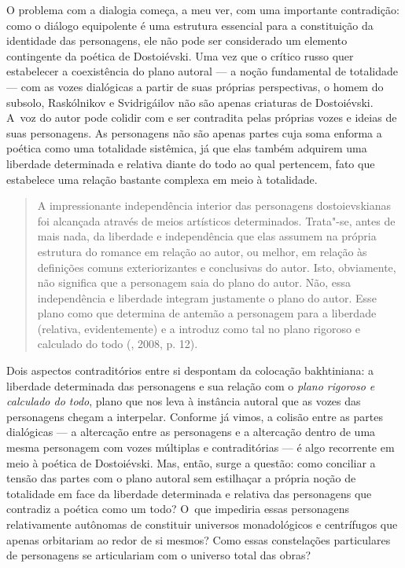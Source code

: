 O problema com a dialogia começa, a meu ver, com uma importante
contradição: como o diálogo equipolente é uma estrutura essencial para a
constituição da identidade das personagens, ele não pode ser considerado
um elemento contingente da poética de Dostoiévski. Uma vez que o crítico
russo quer estabelecer a coexistência do plano autoral --- a noção
fundamental de totalidade --- com as vozes dialógicas a partir de suas
próprias perspectivas, o homem do subsolo, Raskólnikov e Svidrigáilov
não são apenas criaturas de Dostoiévski. A~voz do autor pode colidir com
e ser contradita pelas próprias vozes e ideias de suas personagens. As
personagens não são apenas partes cuja soma enforma a poética como uma
totalidade sistêmica, já que elas também adquirem uma liberdade
determinada e relativa diante do todo ao qual pertencem, fato que
estabelece uma relação bastante complexa em meio à totalidade.

\begin{quote}
A impressionante independência interior das personagens dostoievskianas
foi alcançada através de meios artísticos determinados. Trata"-se, antes
de mais nada, da liberdade e independência que elas assumem na própria
estrutura do romance em relação ao autor, ou melhor, em relação às
definições comuns exteriorizantes e conclusivas do autor. Isto,
obviamente, não significa que a personagem saia do plano do autor. Não,
essa independência e liberdade integram justamente o plano do autor.
Esse plano como que determina de antemão a personagem para a liberdade
(relativa, evidentemente) e a introduz como tal no plano rigoroso e
calculado do todo (, 2008, p. 12).
\end{quote}

Dois aspectos contraditórios entre si despontam da colocação
bakhtiniana: a liberdade determinada das personagens e sua relação com o
\emph{plano rigoroso e calculado do todo}, plano que nos leva à
instância autoral que as vozes das personagens chegam a interpelar.
Conforme já vimos, a colisão entre as partes dialógicas --- a altercação
entre as personagens e a altercação dentro de uma mesma personagem com
vozes múltiplas e contraditórias --- é algo recorrente em meio à poética
de Dostoiévski. Mas, então, surge a questão: como conciliar a tensão das
partes com o plano autoral sem estilhaçar a própria noção de totalidade
em face da liberdade determinada e relativa das personagens que
contradiz a poética como um todo? O~que impediria essas personagens
relativamente autônomas de constituir universos monadológicos e
centrífugos que apenas orbitariam ao redor de si mesmos? Como essas
constelações particulares de personagens se articulariam com o universo
total das obras?

